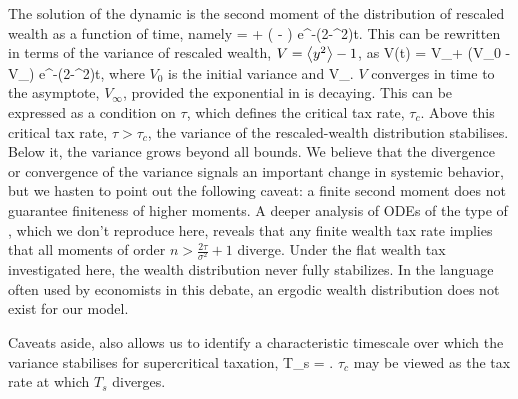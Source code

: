 The solution of the dynamic  is the second moment 
of the distribution of rescaled wealth as a function of time, namely
\be
{} =  + \left( - \right) e^{-(2\tau-\sigma^2)t}.
\ee
This can be rewritten in terms of the variance of rescaled wealth, $V=\left\langle y^2 \right\rangle-1$, as
\be
V(t) = V_\infty + (V_0 - V_\infty) e^{-(2\tau-\sigma^2)t},
\ee
where $V_0$ is the initial variance and
\be
V_\infty \equiv {}.
\ee
$V$ converges in time to the asymptote, $V_\infty$, provided the exponential in  is decaying. This can be expressed as a condition on $\tau$,
\be
{}
\ee
which defines the critical tax rate, $\tau_c$. Above this critical tax rate, $\tau>\tau_c$, the 
variance of the rescaled-wealth distribution stabilises. Below it, the variance grows beyond all bounds.
We believe that the divergence or convergence of the variance signals an important change
in systemic behavior, but we hasten to point out the following caveat: a finite second moment 
does not guarantee finiteness of higher moments. A deeper analysis of ODEs of the type of 
, which we don't reproduce here, reveals that any finite wealth tax rate implies
that all moments of order $n>\frac{2\tau}{\sigma^2}+1$ diverge. Under the flat 
wealth tax investigated here, the wealth distribution never fully stabilizes. In the language often
used by economists in this debate, an ergodic wealth distribution does not exist for our model.

Caveats aside,  also allows us to identify a characteristic timescale over 
which the variance stabilises for supercritical taxation,
\be
T_s = .
\ee
$\tau_c$ may be viewed as the tax rate at which $T_s$ diverges.

